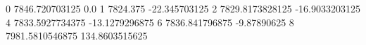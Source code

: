 0 7846.720703125 0.0
1 7824.375 -22.345703125
2 7829.8173828125 -16.9033203125
4 7833.5927734375 -13.1279296875
6 7836.841796875 -9.87890625
8 7981.5810546875 134.8603515625
